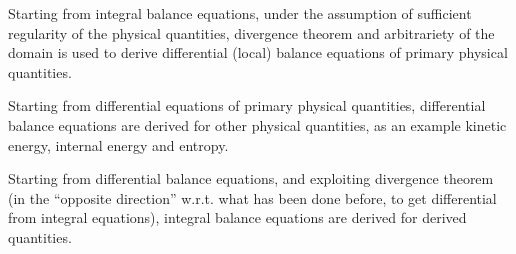 \documentclass[letterpaper,10pt,english]{jupyterBook}
\begin{document}
\sphinxAtStartPar
{} Starting from integral balance equations, under the assumption of sufficient regularity of the physical quantities, divergence theorem and arbitrariety of the domain is used to derive differential (local) balance equations of primary physical quantities.

\sphinxAtStartPar
{} Starting from differential equations of primary physical quantities, differential balance equations are derived for other physical quantities, as an example kinetic energy, internal energy and entropy.

\sphinxAtStartPar
{} Starting from differential balance equations, and exploiting divergence theorem (in the “opposite direction” w.r.t. what has been done before, to get differential from integral equations), integral balance equations are derived for derived quantities.

\sphinxstepscope
\end{document}
